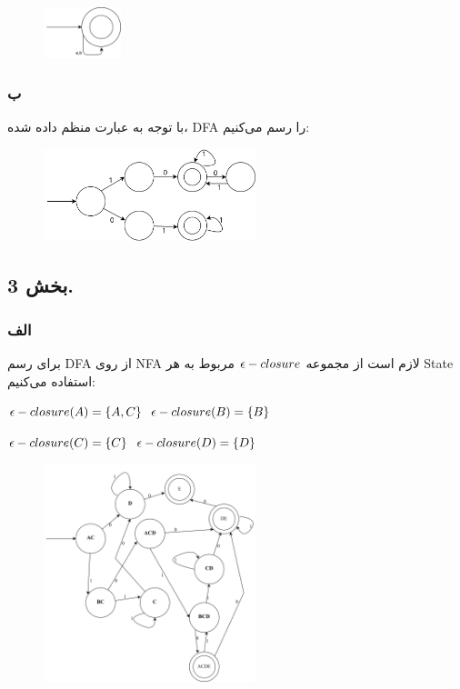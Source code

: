 \begin{figure}[htbp]
	\centering
	\includegraphics[width=0.20\textwidth]{q3s2p1.png}
\end{figure}



\subsubsection*{ب}
با توجه به عبارت منظم داده شده، DFA را رسم می‌کنیم:
\begin{figure}[htbp]
	\centering
	\includegraphics[width=0.55\textwidth]{q3s2p2.png}
\end{figure}

\subsection*{بخش 3.}
\subsubsection*{الف}
برای رسم DFA از روی NFA لازم است از مجموعه ${\LARGE \epsilon} - closure$ مربوط به هر State استفاده می‌کنیم:

\setLTR

${\LARGE \epsilon} - closure(A)= \left\{A,C\right\}$ \hspace{1em} ${\LARGE \epsilon} - closure(B)= \left\{B\right\}$ 

${\LARGE \epsilon} - closure(C)=\left\{C\right\}$  \hspace{1.9em}  ${\LARGE \epsilon} - closure(D)= \left\{D\right\}$ 

\setRTL

\begin{figure}[htbp]
	\centering
	\includegraphics[width=0.55\textwidth]{q3s3p1.png}
\end{figure}

